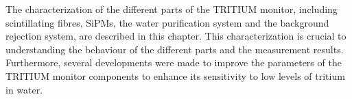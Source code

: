 The characterization of the different parts of the TRITIUM monitor, including scintillating fibres, SiPMs, the water purification system and the background rejection system, are described in this chapter. This characterization is crucial to understanding the behaviour of the different parts and the measurement results. Furthermore, several developments were made  to improve the parameters of the TRITIUM monitor components to enhance its sensitivity to low levels of tritium in water. %